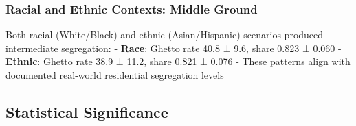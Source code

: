 \documentclass[
  11pt,
]{article}
\begin{document}
\subsubsection{Racial and Ethnic Contexts: Middle
Ground}\label{racial-and-ethnic-contexts-middle-ground}

Both racial (White/Black) and ethnic (Asian/Hispanic) scenarios produced
intermediate segregation: - \textbf{Race}: Ghetto rate 40.8 ± 9.6, share
0.823 ± 0.060 - \textbf{Ethnic}: Ghetto rate 38.9 ± 11.2, share 0.821 ±
0.076 - These patterns align with documented real-world residential
segregation levels

\subsection{Statistical Significance}\label{statistical-significance}
\end{document}
